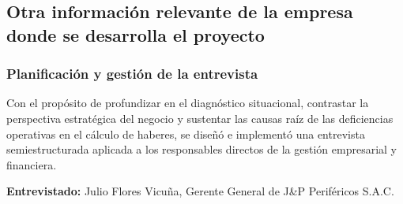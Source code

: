 
\subsection{Otra información relevante de la empresa donde se desarrolla el proyecto}

\subsubsection{Planificación y gestión de la entrevista}

Con el propósito de profundizar en el diagnóstico situacional, contrastar la perspectiva estratégica del negocio y sustentar las causas raíz de las deficiencias operativas en el cálculo de haberes, se diseñó e implementó una entrevista semiestructurada aplicada a los responsables directos de la gestión empresarial y financiera.

\vspace{0.3cm}
\noindent\textbf{Entrevistado:} Julio Flores Vicuña, Gerente General de J\&P Periféricos S.A.C.
\vspace{0.4cm}

